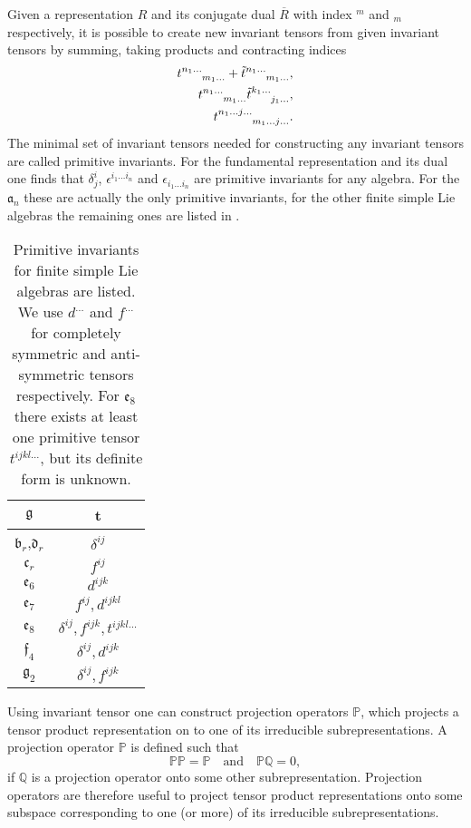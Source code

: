 Given a representation $R$ and its conjugate dual $\overbar{R}$ with index $^m$ and $_m$ respectively, it is possible to create new invariant tensors from given invariant tensors by summing, taking products and contracting indices
\begin{equation}
\begin{aligned}
\tensor{t}{^{n_1\ldots}_{m_1\ldots}}+\tensor{\tilde{t}}{^{n_1\ldots}_{m_1\ldots}},\\
\tensor{t}{^{n_1\ldots}_{m_1\ldots}}\tensor{\tilde{t}}{^{k_1\ldots}_{j_1\ldots}},\\
\tensor{t}{^{n_1\ldots j\ldots}_{m_1\ldots j\ldots}}.
\end{aligned}
\end{equation}
The minimal set of invariant tensors needed for constructing any invariant tensors are called primitive invariants. For the fundamental representation and its dual one finds that $\delta^i_j$, $\epsilon^{i_1\ldots i_n}$ and $\epsilon_{i_1\ldots i_n}$ are primitive invariants for any algebra. For the $\mathfrak{a}_n$ these are actually the only primitive invariants, for the other finite simple Lie algebras the remaining ones are listed in .
\begin{table}\centering
    \caption{Primitive invariants for finite simple Lie algebras are listed. We use $d^{\ldots}$ and $f^{\ldots}$ for completely symmetric and anti-symmetric tensors respectively. For $\mathfrak{e}_8$ there exists at least one primitive tensor $t^{ijkl\ldots}$, but its definite form is unknown.}
    \label{tab:PrimInvariant}
    \begin{tabular}{|c|c|}\hline
        $\mathfrak{g}$ & t\\\hline
        $\mathfrak{b}_r$,$\mathfrak{d}_r$ & $\delta^{ij}$\\\hline
        $\mathfrak{c}_r$ & $f^{ij}$\\\hline
        $\mathfrak{e}_6$ & $d^{ijk}$\\\hline
        $\mathfrak{e}_7$ & $f^{ij},d^{ijkl}$\\\hline
        $\mathfrak{e}_8$ & $\delta^{ij},f^{ijk},t^{ijkl\ldots}$\\\hline
        $\mathfrak{f}_4$ & $\delta^{ij},d^{ijk}$\\\hline
        $\mathfrak{g}_2$ & $\delta^{ij},f^{ijk}$\\\hline
    \end{tabular}
\end{table}

Using invariant tensor one can construct projection operators $\mathbb{P}$, which projects a tensor product representation on to one of its irreducible subrepresentations. A projection operator $\mathbb{P}$ is defined such that 
\begin{equation}
    \mathbb{P}\mathbb{P} = \mathbb{P}\quad \text{and}\quad \mathbb{P}\mathbb{Q} = 0,
\end{equation}
if $\mathbb{Q}$ is a projection operator onto some other subrepresentation. Projection operators are therefore useful to project tensor product representations onto some subspace corresponding to one (or more) of its irreducible subrepresentations. 


